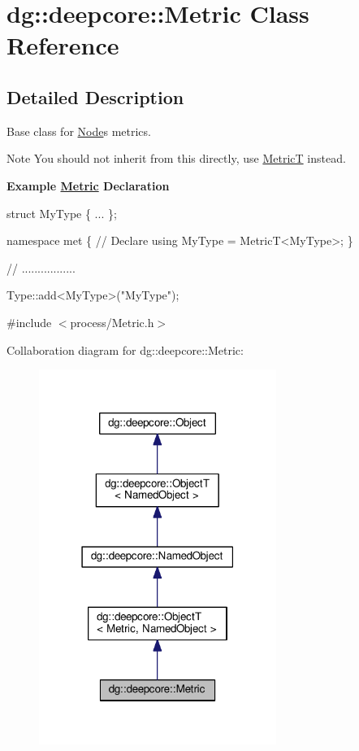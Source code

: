 \hypertarget{classdg_1_1deepcore_1_1_metric}{}\section{dg\+:\+:deepcore\+:\+:Metric Class Reference}
\label{classdg_1_1deepcore_1_1_metric}


\subsection{Detailed Description}
Base class for \hyperlink{classdg_1_1deepcore_1_1_node}{Node}\textquotesingle{}s metrics. 

\begin{DoxyNote}{Note}
You should not inherit from this directly, use \hyperlink{structdg_1_1deepcore_1_1_metric_t}{MetricT} instead.
\end{DoxyNote}
{\bfseries Example \hyperlink{classdg_1_1deepcore_1_1_metric}{Metric} Declaration} 
\begin{DoxyCode}
\textcolor{keyword}{struct }MyType \{ ... \};

\textcolor{keyword}{namespace }met \{
    \textcolor{comment}{// Declare}
    \textcolor{keyword}{using} MyType = MetricT<MyType>;
\}

\textcolor{comment}{// .................}

Type::add<MyType>(\textcolor{stringliteral}{"MyType"});
\end{DoxyCode}
 

{\ttfamily \#include $<$process/\+Metric.\+h$>$}



Collaboration diagram for dg\+:\+:deepcore\+:\+:Metric\+:
\nopagebreak
\begin{figure}[H]
\begin{center}
\leavevmode
\includegraphics[width=219pt]{classdg_1_1deepcore_1_1_metric__coll__graph}
\end{center}
\end{figure}
